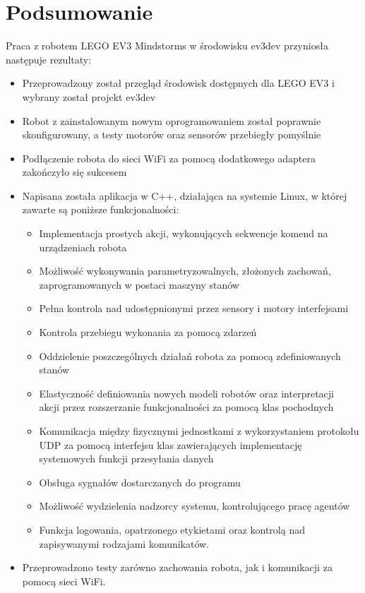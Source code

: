 \chapter{Podsumowanie}
\label{ch:podsumowanie}

Praca z robotem LEGO EV3 Mindstorms w środowisku ev3dev przyniosła następuje rezultaty:

\begin{itemize}
    \item Przeprowadzony został przegląd środowisk dostępnych dla LEGO EV3 i wybrany został projekt ev3dev
    \item Robot z zainstalowanym nowym oprogramowaniem został poprawnie skonfigurowany, a testy motorów oraz sensorów przebiegły pomyślnie
    \item Podłączenie robota do sieci WiFi za pomocą dodatkowego adaptera zakończyło się sukcesem
    \item Napisana została aplikacja w C++, działająca na systemie Linux, w której zawarte są poniższe funkcjonalności:
    \begin{itemize}
        \item Implementacja prostych akcji, wykonujących sekwencje komend na\,urządzeniach robota
        \item Możliwość wykonywania parametryzowalnych, złożonych zachowań,\\zaprogramowanych w postaci maszyny stanów
        \item Pełna kontrola nad udostępnionymi przez sensory i motory interfejsami
        \item Kontrola przebiegu wykonania za pomocą zdarzeń
        \item Oddzielenie poszczególnych działań robota za pomocą zdefiniowanych stanów
        \item Elastyczność definiowania nowych modeli robotów oraz interpretacji\\akcji przez rozszerzanie funkcjonalności za pomocą klas pochodnych
        \item Komunikacja między fizycznymi jednostkami z wykorzystaniem protokołu UDP za pomocą interfejsu klas zawierających implementację\\systemowych funkcji przesyłania danych
        \item Obsługa sygnałów dostarczanych do programu
        \item Możliwość wydzielenia nadzorcy systemu, kontrolującego pracę agentów
        \item Funkcja logowania, opatrzonego etykietami oraz kontrolą nad zapisywanymi rodzajami komunikatów.
    \end{itemize}
    \item Przeprowadzono testy zarówno zachowania robota, jak i komunikacji za pomocą sieci WiFi.
\end{itemize}


